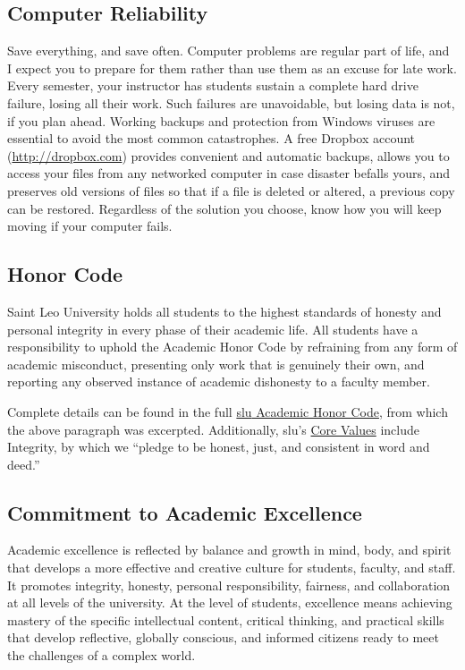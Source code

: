 \documentclass[11pt,oneside]{amsart}	%
\begin{document}
\subsection{Computer Reliability}\label{sub:reliability}
Save everything, and save often.  Computer problems are regular part of life, and I expect you to prepare for them rather than use them as an excuse for late work. Every semester, your instructor has students sustain a complete hard drive failure, losing all their work. Such failures are unavoidable, but losing data is not, if you plan ahead. Working backups and protection from Windows viruses are essential to avoid the most common catastrophes.  A free Dropbox account (\href{http://db.tt/mzWxY8s}{http://dropbox.com}) provides convenient and automatic backups, allows you to access your files from any networked computer in case disaster befalls yours, and preserves old versions of files so that if a file is deleted or altered, a previous copy can be restored. Regardless of the solution you choose, know how you will keep moving if your computer fails.

\subsection{Honor Code} %
\label{sub:honor_code}
Saint Leo University holds all students to the highest standards of honesty and personal integrity in every phase of their academic life. All students have a responsibility to uphold the Academic Honor Code by refraining from any form of academic misconduct, presenting only work that is genuinely their own, and reporting any observed instance of academic dishonesty to a faculty member.

Complete details can be found in the full \href{http://www.saintleo.edu/media/626793/academic_honor_code_policy.pdf}{\ac{slu} Academic Honor Code}, from which the above paragraph was excerpted. Additionally, \ac{slu}'s \href{http://www.saintleo.edu/about/florida-catholic-university.aspx}{Core Values} include Integrity, by which we ``pledge to be honest, just, and consistent in word and deed.''

\subsection{Commitment to Academic Excellence} %
\label{sub:commitment_to_academic_excellence}
Academic excellence is reflected by balance and growth in mind, body, and spirit that develops a more effective and creative culture for students, faculty, and staff. It promotes integrity, honesty, personal responsibility, fairness, and collaboration at all levels of the university. At the level of students, excellence means achieving mastery of the specific intellectual content, critical thinking, and practical skills that develop reflective, globally conscious, and informed citizens ready to meet the challenges of a complex world.
\end{document}
